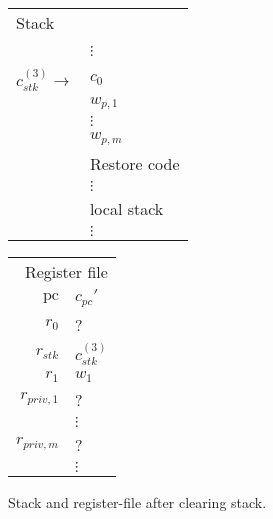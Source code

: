 \documentclass[a4paper]{article}
\newcommand{\var}[1]{\mathit{#1}}
\newcommand{\pc}{\mathit{pc}}
\newcommand{\pcreg}{\mathrm{pc}}
\begin{document}
\begin{figure}
  \label{fig:stack-after-restore-code}
  \centering
  \begin{tabular}[!h]{r | >{\raggedright\arraybackslash}p{3cm} |}
\multicolumn{2}{l}{Stack} \\
\cline{2-2}
   & \\
   & $\vdots$\\
\cline{2-2}
   & 0 \\
\cline{2-2}
$c_{\var{stk}}^{(3)} \rightarrow$  & $c_0$ \\
\cline{2-2}
   & $w_{p,1}$ \\
\cline{2-2}
   & $\vdots$ \\
\cline{2-2}
   & $w_{p,m}$ \\
\cline{2-2}
   & Restore code \\
   & $\vdots$\\
\cline{2-2}
   & local stack\\
   & $\vdots$\\
\cline{2-2}
\end{tabular}
\hspace{1cm}
\begin{tabular}{r | >{\centering\arraybackslash}p{0.75cm} |}
\multicolumn{2}{r}{Register file} \\
\cline{2-2}
$\pcreg$ & $c_\pc'$\\
\cline{2-2}
$r_0$  &  ? \\
\cline{2-2}
$r_{\var{stk}}$  & $c_{\var{stk}}^{(3)}$ \\
\cline{2-2}
$r_1$ & $w_1$ \\
\cline{2-2}
$r_{\var{priv},1}$ & ?\\
\cline{2-2}
& $\vdots$ \\
\cline{2-2}
$r_{\var{priv},m}$ & ? \\
\cline{2-2}
& $\vdots$ \\
\cline{2-2}
\end{tabular}
\caption{ Stack and register-file after clearing stack. }
\end{figure}
\end{document}
